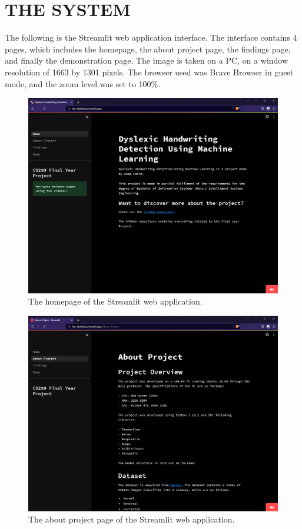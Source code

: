 \chapter{THE SYSTEM}
\label{app:system}

The following is the Streamlit web application interface. The interface contains 4 pages, which includes the homepage, the about project page, the findings page, and finally the demonstration page. The image is taken on a PC, on a window resolution of 1663 by 1301 pixels. The browser used was Brave Browser in guest mode, and the zoom level was set to 100\%. 



\begin{figure}[h]
    \centering
    \includegraphics[scale=0.3]{./appendices/images/home.png}
    \caption{The homepage of the Streamlit web application.}
    \label{fig:home}
\end{figure}

\begin{figure}[h]
    \centering
    \includegraphics[scale=0.3]{./appendices/images/about.png}
    \caption{The about project page of the Streamlit web application.}
    \label{fig:home}
\end{figure}

